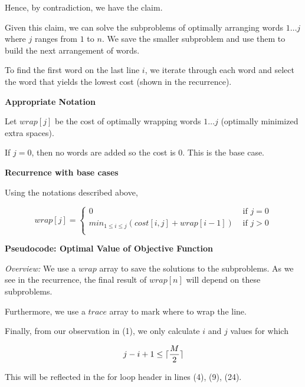 \documentclass[a4paper]{report}
\DeclarePairedDelimiter{\ceil}{\lceil}{\rceil}
\begin{document}
\begin{enumerate}
      Hence, by contradiction, we have the claim.

      Given this claim, we can solve the subproblems of optimally arranging words $1 \dots j$ where $j$ ranges from $1$ to $n$.
      We save the smaller subproblem and use them to build the next arrangement of words.

      To find the first word on the last line $i$, we iterate through each word and select the word that yields
      the lowest cost (shown in the recurrence). 

      {\bf Appropriate Notation}

      Let $wrap[j]$ be the cost of optimally wrapping words $1\dots j$ (optimally minimized extra spaces).

      If $j=0$, then no words are added so the cost is $0$. This is the base case.

      {\bf Recurrence with base cases}

      Using the notations described above, 

      \begin{displaymath}
        wrap[j] = \left\{
          \begin{array}{lr}
            0  &   \text{ if $j=0$}\\
            min_{1 \leq i \leq j} (cost[i,j] + wrap[i -1])  &   \text{ if $j > 0$}\\
          \end{array}
          \right.
        \end{displaymath} 



      {\bf Pseudocode: Optimal Value of Objective Function}

      {\it Overview:}
      We use a $wrap$ array to save the solutions to the subproblems. As we see in the recurrence, the final 
      result of $wrap[n]$ will depend on these subproblems.

      Furthermore, we use a $trace$ array to mark where to wrap the line.

      Finally, from our observation in (1), we only calculate $i$ and $j$ values for which 

      $$ j - i + 1 \leq \ceil{\frac{M}{2}} $$

      This will be reflected in the for loop header in lines (4), (9), (24).

      \begin{algorithmic}[1]


\end{algorithmic}
\end{enumerate}
\end{document}
